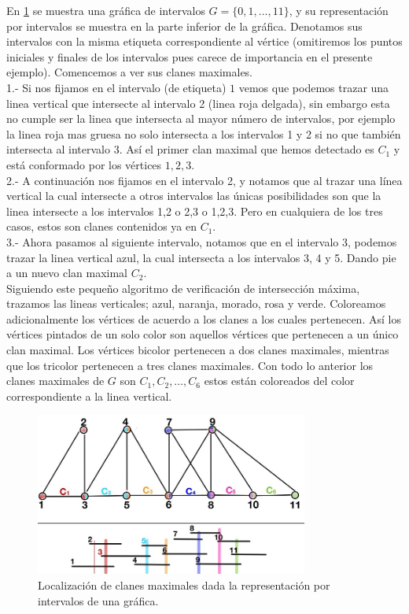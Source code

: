 En \cref{fig:MaxClqs01} se muestra una gráfica de intervalos $G=\{ 0,1, ...,
11\}$, y su representación por intervalos se muestra en la parte inferior de la
gráfica. Denotamos sus intervalos con la misma etiqueta correspondiente al
vértice (omitiremos los puntos iniciales y finales de los intervalos pues carece
de importancia en el presente ejemplo).     
Comencemos a ver sus clanes maximales.\\
1.- Si nos fijamos en el intervalo (de etiqueta) $1$ vemos que podemos trazar
una linea vertical que intersecte al intervalo 2 (linea roja delgada), sin
embargo esta no cumple ser la linea que intersecta al mayor número de
intervalos, por ejemplo la linea roja mas gruesa no solo intersecta a los
intervalos 1 y 2 si no que también intersecta al intervalo 3. Así el primer clan
maximal que hemos detectado es $C_1$ y está conformado por los vértices
$1,2,3$.\\
2.- A continuación nos fijamos en el intervalo 2, y notamos que al trazar una
línea vertical la cual intersecte a otros intervalos las únicas posibilidades
son que la linea intersecte a los intervalos 1,2 o 2,3 o 1,2,3. Pero en
cualquiera de los tres casos, estos son clanes contenidos ya en $C_1$.\\
3.- Ahora pasamos al siguiente intervalo, notamos que en el intervalo 3, podemos
trazar la linea vertical azul, la cual intersecta a los intervalos 3, 4 y 5.
Dando pie a un nuevo clan maximal $C_2$. \\
Siguiendo este pequeño algoritmo de verificación de intersección máxima,
trazamos las lineas verticales; azul, naranja, morado, rosa y verde. Coloreamos
adicionalmente los vértices de acuerdo a los clanes a los cuales pertenecen. Así
los vértices pintados de un solo color son aquellos vértices que pertenecen a un
único clan maximal. Los vértices bicolor pertenecen a dos clanes maximales,
mientras que los tricolor pertenecen a tres clanes maximales. Con todo lo
anterior los clanes maximales de $G$ son $C_1, C_2, ..., C_6$ estos están
coloreados del color correspondiente a la linea vertical.    


\begin{figure}[H]
  \centering
  \includegraphics[width=0.8\textwidth]{recursos/capturas/208.jpg}
  \caption{Localización de clanes maximales dada la representación por intervalos de una gráfica.}
  \label{fig:MaxClqs01}
\end{figure}

